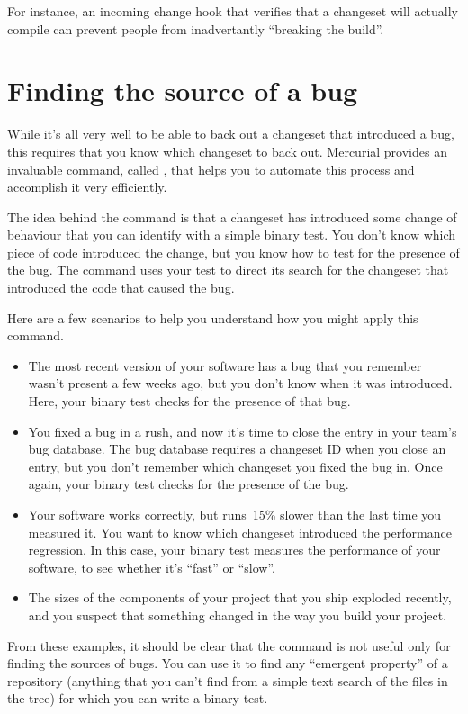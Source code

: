 For instance, an incoming change hook that verifies that a changeset
will actually compile can prevent people from inadvertantly ``breaking
the build''.

\section{Finding the source of a bug}
\label{sec:undo:bisect}

While it's all very well to be able to back out a changeset that
introduced a bug, this requires that you know which changeset to back
out.  Mercurial provides an invaluable command, called
, that helps you to automate this process and accomplish
it very efficiently.

The idea behind the  command is that a changeset has
introduced some change of behaviour that you can identify with a
simple binary test.  You don't know which piece of code introduced the
change, but you know how to test for the presence of the bug.  The
 command uses your test to direct its search for the
changeset that introduced the code that caused the bug.

Here are a few scenarios to help you understand how you might apply
this command.
\begin{itemize}
\item The most recent version of your software has a bug that you
  remember wasn't present a few weeks ago, but you don't know when it
  was introduced.  Here, your binary test checks for the presence of
  that bug.
\item You fixed a bug in a rush, and now it's time to close the entry
  in your team's bug database.  The bug database requires a changeset
  ID when you close an entry, but you don't remember which changeset
  you fixed the bug in.  Once again, your binary test checks for the
  presence of the bug.
\item Your software works correctly, but runs~15\% slower than the
  last time you measured it.  You want to know which changeset
  introduced the performance regression.  In this case, your binary
  test measures the performance of your software, to see whether it's
  ``fast'' or ``slow''.
\item The sizes of the components of your project that you ship
  exploded recently, and you suspect that something changed in the way
  you build your project.
\end{itemize}

From these examples, it should be clear that the 
command is not useful only for finding the sources of bugs.  You can
use it to find any ``emergent property'' of a repository (anything
that you can't find from a simple text search of the files in the
tree) for which you can write a binary test.

